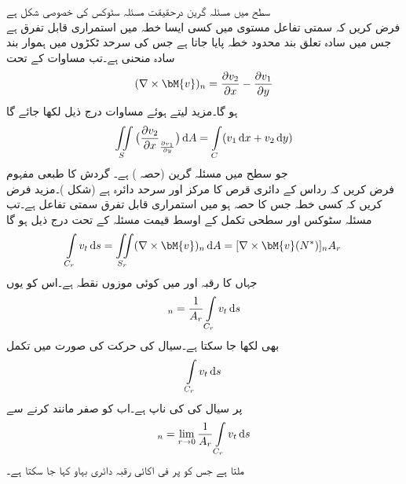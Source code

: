 \quad سطح میں مسئلہ گرین درحقیقت مسئلہ سٹوکس کی خصوصی شکل ہے\\
فرض کریں کہ سمتی تفاعل  مستوی   میں کسی ایسا خطہ میں استمراری قابل تفرق ہے  جس میں سادہ تعلق بند محدود خطہ  پایا جاتا ہے جس کی سرحد  ٹکڑوں میں ہموار بند سادہ منحنی ہے۔تب مساوات  کے تحت
\begin{align*}
(\nabla \times \bM{v})_n=\frac{\partial v_2}{\partial x}-\frac{\partial v_1}{\partial y}
\end{align*}
ہو گا۔مزید  لیتے ہوئے  مساوات  درج ذیل لکھا جائے گا
\begin{align*}
\iint\limits_S \big(\frac{\partial v_2}{\partial x}_\frac{\partial v_1}{\partial y}\big)\dif A=\int\limits_C (v_1\dif x+v_2\dif y)
\end{align*}
جو سطح میں مسئلہ گرین (حصہ ) ہے۔
\quad گردش کا طبعی مفہوم\\
فرض کریں کہ رداس  کے دائری قرص  کا مرکز  اور سرحد دائرہ  ہے (شکل )۔مزید فرض کریں کہ کسی خطہ جس کا   حصہ ہو میں  استمراری قابل تفرق سمتی تفاعل  ہے۔تب مسئلہ سٹوکس اور سطحی تکمل کے اوسط قیمت مسئلہ کے تحت درج ذیل ہو گا
\begin{align*}
\int\limits_{C_r} v_t\dif s=\iint\limits_{S_r} (\nabla \times \bM{v})_n\dif A=[\nabla \times \bM{v}(N^*)]_n A_r
\end{align*}
جہاں  کا رقبہ  اور  میں  کوئی موزوں نقطہ ہے۔اس کو یوں
\begin{align*}
[\nabla \times \bM{v}(N^*)]_n=\frac{1}{A_r}\int\limits_{C_r} v_t\dif s
\end{align*}
بھی لکھا جا سکتا ہے۔سیال کی حرکت کی صورت میں تکمل
\begin{align*}
\int\limits_{C_r}v_t\dif s
\end{align*}
 پر سیال کی  کی ناپ ہے۔اب   کو صفر مانند کرنے سے
\begin{align}
[\nabla \times \bM{v}(N)]_n=\lim_{r\to 0}\frac{1}{A_r}\int\limits_{C_r} v_t\dif s
\end{align}
ملتا ہے جس کو  پر فی اکائی رقبہ  دائری بہاو کہا جا سکتا ہے۔ 
